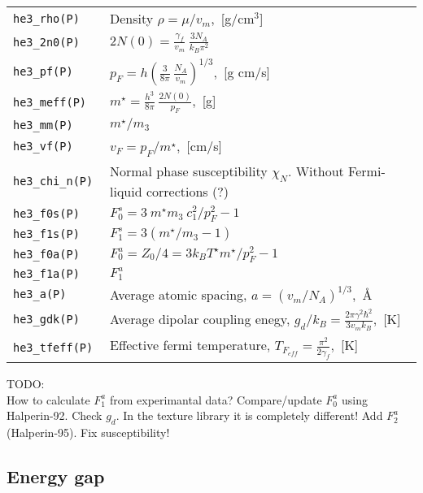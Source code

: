 \documentclass[a4paper]{article}
\begin{document}
\medskip
\begin{tabular}{lp{9cm}}
\tt he3\_rho(P)    & Density $\rho = \mu/v_m$,~[g/cm$^3$]\\
\tt he3\_2n0(P)    & $\displaystyle 2N(0) = \frac{\gamma_f}{v_m}
                     \ \frac{3 N_A}{k_B \pi^2}$\\
\tt he3\_pf(P)     & $\displaystyle p_F = h \left(\frac{3}{8\pi}
                     \ \frac{N_A}{v_m}\right)^{1/3}$,~[g cm/s]\\
\tt he3\_meff(P)   & $\displaystyle m^\star = \frac{h^3}{8\pi}
                     \ \frac{2N(0)}{p_F}$,~[g]\\
\tt he3\_mm(P)     & $m^\star/m_3$\\
\tt he3\_vf(P)     & $\displaystyle v_F = p_F/m^\star$,~[cm/s]\\
\tt he3\_chi\_n(P) & Normal phase susceptibility $\chi_{N}$.\newline
                   Without Fermi-liquid corrections (?)\\
\tt he3\_f0s(P)    &$\displaystyle F_0^s = 3\ m^\star m_3\ c_1^2 / p_F^2 - 1$\\
\tt he3\_f1s(P)    &$\displaystyle F_1^s = 3(m^\star/m_3 - 1)$\\
\tt he3\_f0a(P)    &$\displaystyle F_0^a = Z_0/4 = 3 k_B T^\star m^\star / p_F^2 - 1$\\
\tt he3\_f1a(P)    &$\displaystyle F_1^a$\\


\tt he3\_a(P)      &Average atomic spacing,
                    $\displaystyle a=(v_m/N_A)^{1/3}$,~\AA\\
\tt he3\_gdk(P)    &Average dipolar coupling enegy,
                    $\displaystyle g_d/k_B = \frac{2\pi\gamma^2\hbar^2}{3 v_m k_B}$,~[K]\\
\tt he3\_tfeff(P)  &Effective fermi temperature,
                    $\displaystyle T_{F_{eff}} = \frac{\pi^2}{2\gamma_f}$,~[K]\\
\end{tabular}
\medskip

\noindent TODO:\\
How to calculate $F_1^a$ from experimantal data?
Compare/update $F_0^a$ using Halperin-92.
Check $g_d$. In the texture library it is completely different!
Add $F_2^a$ (Halperin-95).
Fix susceptibility!


\eject
\subsection*{Energy gap}
\end{document}
